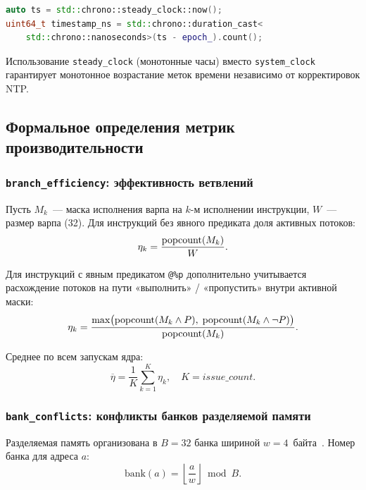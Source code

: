 \begin{lstlisting}[language=C++, caption={Получение временной метки}]
auto ts = std::chrono::steady_clock::now();
uint64_t timestamp_ns = std::chrono::duration_cast<
    std::chrono::nanoseconds>(ts - epoch_).count();
\end{lstlisting}

Использование \texttt{steady\_clock} (монотонные часы) вместо
\texttt{system\_clock} гарантирует монотонное возрастание меток времени
независимо от корректировок NTP.

\subsection{Формальное определения метрик производительности}

\subsubsection{\texttt{branch\_efficiency}: эффективность ветвлений}

Пусть $M_k$~--- маска исполнения варпа на $k$-м исполнении инструкции,
$W$~--- размер варпа (32). Для инструкций без явного предиката
доля активных потоков:
\begin{equation}
  \label{eq:branch_eff_ch7}
  \eta_k = \frac{\mathrm{popcount}(M_k)}{W}.
\end{equation}

Для инструкций с явным предикатом \texttt{@\%p} дополнительно
учитывается расхождение потоков на пути «выполнить» / «пропустить»
внутри активной маски:
\begin{equation}
  \eta_k = \frac{\max\bigl(\mathrm{popcount}(M_k \wedge P),\;
                           \mathrm{popcount}(M_k \wedge \neg P)\bigr)}
                {\mathrm{popcount}(M_k)}.
\end{equation}

Среднее по всем запускам ядра:
\begin{equation}
  \overline{\eta} = \frac{1}{K}\sum_{k=1}^{K} \eta_k,
  \quad K = \mathit{issue\_count}.
\end{equation}

\subsubsection{\texttt{bank\_conflicts}: конфликты банков разделяемой памяти}

Разделяемая память организована в $B = 32$ банка шириной
$w = 4$~байта~\cite{CUDAProgrammingGuide, AmpereWhitepaper}. Номер банка для адреса $a$:
\begin{equation}
  \mathrm{bank}(a) = \left\lfloor \frac{a}{w} \right\rfloor \bmod B.
\end{equation}

